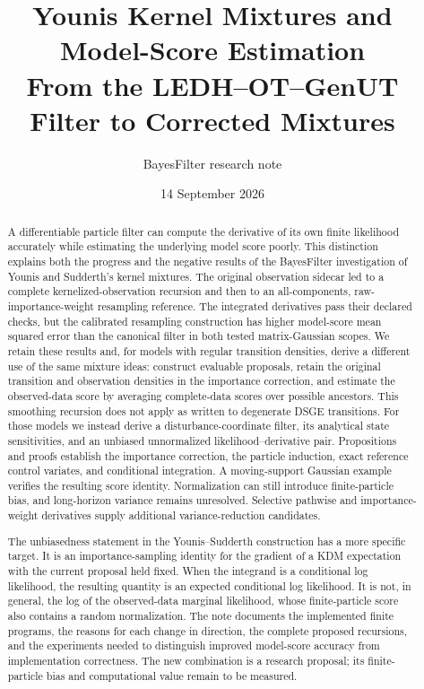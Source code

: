 \documentclass[11pt]{article}
\title{Younis Kernel Mixtures and Model-Score Estimation\\
From the LEDH--OT--GenUT Filter to Corrected Mixtures}
\author{BayesFilter research note}
\date{14 September 2026}
\begin{document}
\maketitle

\begin{abstract}
A differentiable particle filter can compute the derivative of its own
finite likelihood accurately while estimating the underlying model score
poorly. This distinction explains both the progress and the negative results
of the BayesFilter investigation of Younis and Sudderth's kernel mixtures.
The original observation sidecar led to a complete kernelized-observation
recursion and then to an all-components, raw-importance-weight resampling
reference. The integrated derivatives pass their declared checks, but the
calibrated resampling construction has higher model-score mean squared error
than the canonical filter in both tested matrix-Gaussian scopes. We retain
these results and, for models with regular transition densities, derive a
different use of the same mixture ideas: construct evaluable proposals,
retain the original transition and observation densities in the importance
correction, and estimate the observed-data score by averaging complete-data
scores over possible ancestors. This smoothing recursion does not apply as
written to degenerate DSGE transitions. For those models we instead derive
a disturbance-coordinate filter, its analytical state sensitivities, and an
unbiased unnormalized likelihood--derivative pair. Propositions and proofs
establish the importance correction, the particle induction, exact reference
control variates, and conditional integration. A moving-support Gaussian
example verifies the resulting score identity. Normalization can still
introduce finite-particle bias, and long-horizon variance remains unresolved.
Selective pathwise and importance-weight derivatives supply additional
variance-reduction candidates.

The unbiasedness statement in the Younis--Sudderth construction has a more
specific target. It is an importance-sampling identity for the gradient of a
KDM expectation with the current proposal held fixed. When the integrand is a
conditional log likelihood, the resulting quantity is an expected conditional
log likelihood. It is not, in general, the log of the observed-data marginal
likelihood, whose finite-particle score also contains a random normalization.
The note documents the implemented finite programs, the reasons for each
change in direction, the complete proposed recursions, and the experiments
needed to distinguish improved model-score accuracy from implementation
correctness. The new combination is a research proposal; its finite-particle
bias and computational value remain to be measured.
\end{abstract}
\clearpage
\tableofcontents
\clearpage
\end{document}
